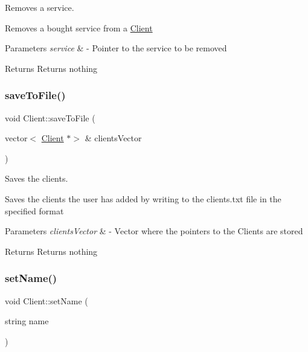 Removes a service. 

Removes a bought service from a \hyperlink{class_client}{Client}


\begin{DoxyParams}{Parameters}
{\em service} & -\/ Pointer to the service to be removed \\
\hline
\end{DoxyParams}
\begin{DoxyReturn}{Returns}
Returns nothing 
\end{DoxyReturn}
\mbox{\label{class_client_aceebaabb74ad1e3e5b30c168e5ef681b}} 
\subsubsection{\texorpdfstring{save\+To\+File()}{saveToFile()}}
{\footnotesize\ttfamily void Client\+::save\+To\+File (\begin{DoxyParamCaption}\item[{vector$<$ \hyperlink{class_client}{Client} $\ast$$>$ \&}]{clients\+Vector }\end{DoxyParamCaption})\hspace{0.3cm}{\ttfamily [static]}}



Saves the clients. 

Saves the clients the user has added by writing to the clients.\+txt file in the specified format


\begin{DoxyParams}{Parameters}
{\em clients\+Vector} & -\/ Vector where the pointers to the Clients are stored \\
\hline
\end{DoxyParams}
\begin{DoxyReturn}{Returns}
Returns nothing 
\end{DoxyReturn}
\mbox{\label{class_client_a1c7f938360e23b3e0e52d17965f88725}} 
\subsubsection{\texorpdfstring{set\+Name()}{setName()}}
{\footnotesize\ttfamily void Client\+::set\+Name (\begin{DoxyParamCaption}\item[{string}]{name }\end{DoxyParamCaption})}



